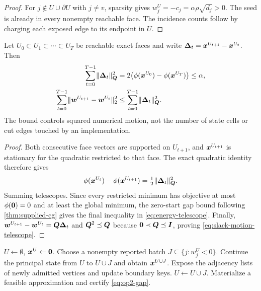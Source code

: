 \begin{proof}
For $j\notin U\cup\partial U$ with $j\neq v$, sparsity gives
$w_j^U=-c_j=\alpha\rho\sqrt{d_j}>0$.  The seed is already in every nonempty
reachable face.  The incidence counts follow by charging each exposed edge to
its endpoint in $U$.
\end{proof}

\begin{proposition}
\label{prop:motion-telescope}
Let $U_0\subset U_1\subset\cdots\subset U_T$ be reachable exact faces and
write $\bm{\Delta}_t=\bm{x}^{U_{t+1}}-\bm{x}^{U_t}$.  Then
\begin{align}
 \sum_{t=0}^{T-1}\lVert\bm{\Delta}_t\rVert_{\bm{Q}}^2
 &=2\bigl(\phi(\bm{x}^{U_0})-\phi(\bm{x}^{U_T})\bigr)
 \leq\alpha,
 \label{eq:energy-telescope}\\
 \sum_{t=0}^{T-1}\lVert\bm{w}^{U_{t+1}}-\bm{w}^{U_t}\rVert_2^2
 &\leq\sum_{t=0}^{T-1}\lVert\bm{\Delta}_t\rVert_{\bm{Q}}^2.
 \label{eq:slack-motion-telescope}
\end{align}
The bound controls squared numerical motion, not the number of state cells or
cut edges touched by an implementation.
\end{proposition}

\begin{proof}
Both consecutive face vectors are supported on $U_{t+1}$, and
$\bm{x}^{U_{t+1}}$ is stationary for the quadratic restricted to that face.
The exact quadratic identity therefore gives
\[
 \phi(\bm{x}^{U_t})-\phi(\bm{x}^{U_{t+1}})
 =\tfrac12\lVert\bm{\Delta}_t\rVert_{\bm{Q}}^2.
\]
Summing telescopes.  Since every restricted minimum has objective at most
$\phi(\bm{0})=0$ and at least the global minimum, the zero-start gap bound
following \cref{thm:supplied-cg} gives the final inequality in
\cref{eq:energy-telescope}.  Finally,
$\bm{w}^{U_{t+1}}-\bm{w}^{U_t}=\bm{Q}\bm{\Delta}_t$ and
$\bm{Q}^2\preceq\bm{Q}$ because $\bm{0}\prec\bm{Q}\preceq\bm{I}$, proving
\cref{eq:slack-motion-telescope}.
\end{proof}

\begin{algorithm}[t]
\caption{Exact active-edge LCP skeleton}
\label{alg:skeleton}
\begin{algorithmic}[1]
\STATE $U\gets\emptyset$, $\bm{x}^U\gets\bm{0}$.
  \STATE Choose a nonempty reported batch $J\subseteq\{j:w_j^U<0\}$.
  \STATE Continue the principal state from $U$ to $U\cup J$ and obtain
         $\bm{x}^{U\cup J}$.
  \STATE Expose the adjacency lists of newly admitted vertices and update
         boundary keys.
  \STATE $U\gets U\cup J$.
\ENDWHILE
\STATE Materialize a feasible approximation and certify \cref{eq:op2-gap}.
\end{algorithmic}
\end{algorithm}

